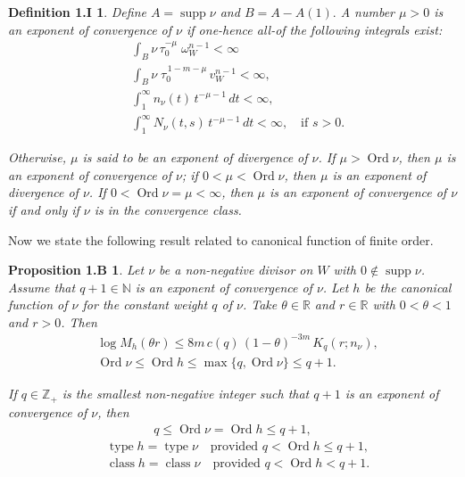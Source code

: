 \documentclass[11pt,reqno]{amsart}
\newtheorem*{propo1B}{Proposition 1.B}
\newtheorem*{defi1I}{Definition 1.I}
\numberwithin{equation}{section}
\begin{document}
\begin{defi1I}\cite[pp. 28-29]{Stoll-1974}
Define $A=\operatorname{supp}\nu$ and $B=A-A(1).$ A number $\mu>0$ is an exponent of convergence of $\nu$ if one-hence all-of
the following integrals exist:
\begin{align*}
&\int_{B} \nu\,\tau_{0}^{-\mu}\;\omega_W^{n-1} < \infty\\
&\int_{B} \nu\;\tau_{0}^{\,1-m-\mu}\,v_W^{n-1} < \infty,\\
&\int_{1}^{\infty} n_{\nu}(t)\,t^{-\mu-1}\,dt < \infty,\\
&\int_{1}^{\infty} N_{\nu}(t,s)\,t^{-\mu-1}\,dt < \infty,
\quad \text{if } s>0.
\end{align*}

Otherwise, $\mu$ is said to be an exponent of divergence of $\nu$. If $\mu>\operatorname{Ord}\nu$, then $\mu$ is an exponent of convergence of $\nu$; if $0<\mu<\operatorname{Ord}\nu$, then $\mu$ is an exponent of divergence of $\nu$.
If $0<\operatorname{Ord}\nu=\mu<\infty$, then $\mu$ is an exponent of convergence of $\nu$ if and only if $\nu$ is in the convergence class.
\end{defi1I}

Now we state the following result related to canonical function of finite order.
\begin{propo1B} \cite[Theorem 6.3]{Stoll-1974} Let $\nu$ be a non-negative divisor on $W$ with $0\notin \operatorname{supp}\nu$.
Assume that $q+1\in\mathbb{N}$ is an exponent of convergence of $\nu$. Let $h$ be the canonical function of $\nu$ for the constant weight $q$ of $\nu$. Take $\theta\in\mathbb{R}$ and $r\in\mathbb{R}$ with $0<\theta<1$ and $r>0$. Then
\begin{align*}
&\log M_h(\theta r)\le 8m\,c(q)\,(1-\theta)^{-3m}\,K_q(r;n_\nu),\\
&\operatorname{Ord}\nu\le \operatorname{Ord} h\le \max\{q,\operatorname{Ord}\nu\}\le q+1.
\end{align*}
	
If $q\in\mathbb{Z}_{+}$ is the smallest non-negative integer such that $q+1$ is an exponent of convergence of $\nu$, then
\begin{align*}
q \le \operatorname{Ord}\nu = \operatorname{Ord} h \le q+1,
\end{align*}
\begin{align*}
&\operatorname{type} h = \operatorname{type}\nu\quad \text{provided } q < \operatorname{Ord} h \le q+1,\\
&\operatorname{class} h = \operatorname{class}\nu\quad \text{provided } q <\operatorname{Ord} h < q+1.
\end{align*}
\end{propo1B}
\end{document}

